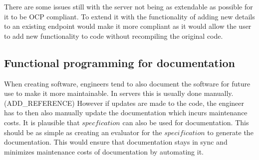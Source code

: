 There are some issues still with the server not being as extendable as possible
for it to be OCP compliant. To extend it with the functionality of adding new
details to an existing endpoint would make it more compliant as it would allow
the user to add new functionality to code without recompiling the original
code.

\subsection{Functional programming for documentation}

When creating software, engineers tend to also document the software for future
use to make it more maintainable. In servers this is usually done manually.
(ADD\_REFERENCE) However if updates are made to the code, the engineer has to
then also manually update the documentation which incurs maintenance costs. It
is plausible that $specfication$ can also be used for documentation. This
should be as simple as creating an evaluator for the $specification$ to
generate the documentation. This would ensure that documentation stays in sync
and minimizes maintenance costs of documentation by automating it.

